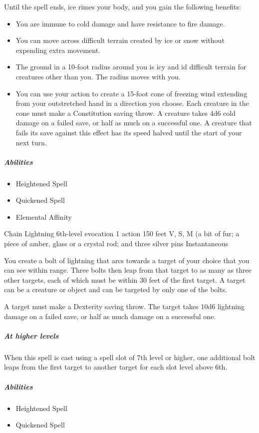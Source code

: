 \documentclass[a4paper,openany,twocolumn]{book}
\begin{document}
Until the spell ends, ice rimes your body, and you gain the following benefits:
\begin{itemize}
  \item You are immune to cold damage and have resistance to fire damage.
  \item You can move across difficult terrain created by ice or snow without expending extra movement.
  \item The ground in a 10-foot radius around you is icy and id difficult terrain for creatures other than you. The radius moves with you.
  \item You can use your action to create a 15-foot cone of freezing wind extending from your outstretched hand in a direction you choose. Each creature in the cone must make a Constitution saving throw. A creature takes 4d6 cold damage on a failed save, or half as much on a successful one. A creature that fails its save against this effect has its speed halved until the start of your next turn.
\end{itemize}

\subparagraph*{Abilities}
\begin{itemize}
  \item Heightened Spell
  \item Quickened Spell
  \item Elemental Affinity
\end{itemize}

\DndSpellHeader
  {Chain Lightning}
  {6th-level evocation}
  {1 action}
  {150 feet}
  {V, S, M (a bit of fur; a piece of amber, glass or a crystal rod; and three silver pins}
  {Instantaneous}

You create a bolt of lightning that arcs towards a target of your choice that you can see within range. Three bolts then leap from that target to as many as three other targets, each of which must be within 30 feet of the first target. A target can be a creature or object and can be targeted by only one of the bolts.

A target must make a Dexterity saving throw. The target takes 10d6 lightning damage on a failed save, or half as much damage on a successful one.

\subparagraph*{At higher levels} When this spell is cast using a spell slot of 7th level or higher, one additional bolt leaps from the first target to another target for each slot level above 6th.

\subparagraph*{Abilities}
\begin{itemize}
  \item Heightened Spell
  \item Quickened Spell
\end{itemize}
\end{document}
